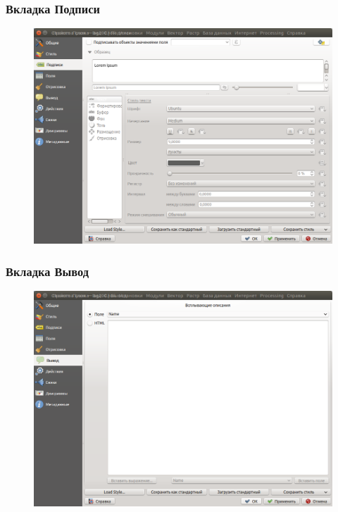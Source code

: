 \begin{frame}
    \frametitle{Вкладка Подписи}
    \begin{figure}[!ht]
           \begin{center}
               \includegraphics[width=0.95\columnwidth]{./practic/img/labels.png}
           \end{center}
       \end{figure}
\end{frame}

\begin{frame}
    \frametitle{Вкладка Вывод}
    \begin{figure}[!ht]
           \begin{center}
               \includegraphics[width=0.95\columnwidth]{./practic/img/hints.png}
           \end{center}
       \end{figure}
\end{frame}


